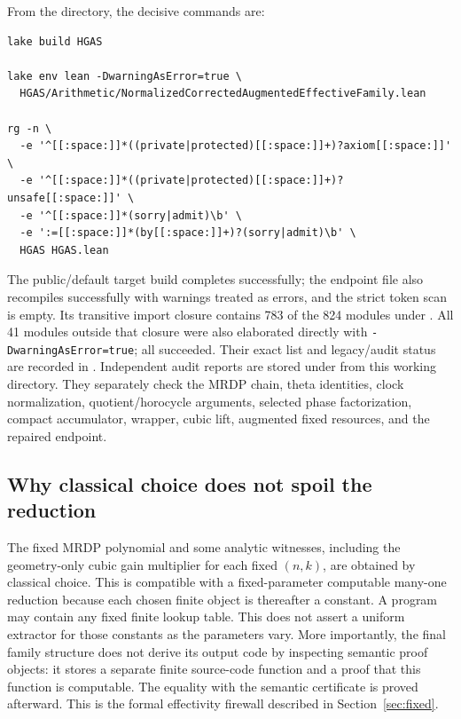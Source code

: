 \documentclass[11pt]{article}
\newcommand{\leanname}[1]{\texttt{\detokenize{#1}}}
\newcommand{\leanmodule}[1]{\path{#1}}
\begin{document}
From the \leanmodule{lean/} directory, the decisive commands are:

\begin{verbatim}
lake build HGAS

lake env lean -DwarningAsError=true \
  HGAS/Arithmetic/NormalizedCorrectedAugmentedEffectiveFamily.lean

rg -n \
  -e '^[[:space:]]*((private|protected)[[:space:]]+)?axiom[[:space:]]' \
  -e '^[[:space:]]*((private|protected)[[:space:]]+)?unsafe[[:space:]]' \
  -e '^[[:space:]]*(sorry|admit)\b' \
  -e ':=[[:space:]]*(by[[:space:]]+)?(sorry|admit)\b' \
  HGAS HGAS.lean
\end{verbatim}

The public/default \leanname{HGAS} target build completes successfully; the
endpoint file also recompiles successfully with warnings treated as errors,
and the strict token scan is empty.  Its transitive import closure contains
783 of the 824 modules under \leanmodule{HGAS/}.  All 41 modules outside
that closure were also elaborated directly with
\texttt{-DwarningAsError=true}; all succeeded.  Their exact list and
legacy/audit status are recorded in \leanmodule{LEGACY_MODULES.md}.
Independent audit reports are stored under \leanmodule{../audits/} from
this working directory.  They separately check the MRDP chain, theta
identities, clock normalization, quotient/horocycle arguments, selected
phase factorization, compact accumulator, wrapper, cubic lift, augmented
fixed resources, and the repaired endpoint.

\subsection{Why classical choice does not spoil the reduction}

The fixed MRDP polynomial and some analytic witnesses, including the
geometry-only cubic gain multiplier for each fixed \((n,k)\), are obtained
by classical choice.  This is compatible with a fixed-parameter computable
many-one reduction because each chosen finite object is thereafter a
constant.  A program may contain any fixed finite lookup table.  This does
not assert a uniform extractor for those constants as the parameters vary.
More importantly, the final
family structure does not derive its output code by inspecting semantic
proof objects: it stores a separate finite source-code function and a proof
that this function is computable.  The equality with the semantic
certificate is proved afterward.  This is the formal effectivity firewall
described in Section~\ref{sec:fixed}.
\end{document}
